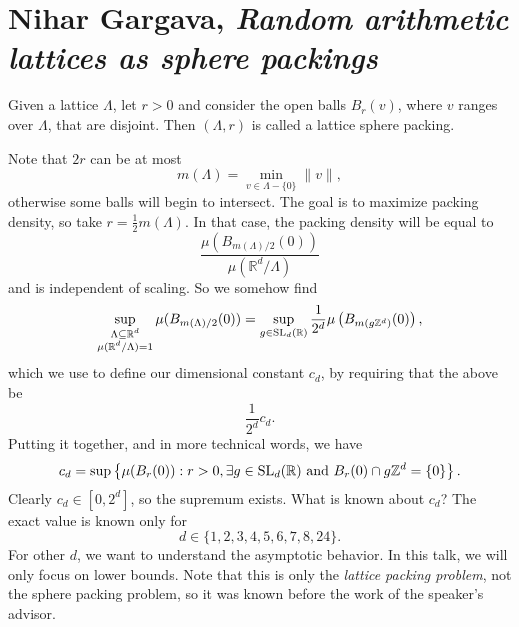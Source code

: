 \documentclass[reqno]{amsart} 
\begin{document}
\section{Nihar Gargava, \emph{Random arithmetic lattices as sphere packings}}
Given a lattice $\Lambda$, let $r > 0$ and consider the open balls $B_r(v)$, where $v$ ranges over $\Lambda$, that are disjoint.  Then $(\Lambda, r)$ is called a lattice sphere packing.

Note that $2 r$ can be at most
\begin{equation*}
  m (\Lambda) = \min_{v \in \Lambda - \{0\}} \lVert v \rVert,
\end{equation*}
otherwise some balls will begin to intersect.  The goal is to maximize packing density, so take $r = \tfrac{1}{2} m (\Lambda) $.  In that case, the packing density will be equal to
\begin{equation*}
  \frac{\mu (B_{m (\Lambda) /2} (0) )}{ \mu (\mathbb{R}^d / \Lambda )}
\end{equation*}
and is independent of scaling.  So we somehow find
\begin{equation*}
  \sup_{
    \substack{
      \Lambda \subseteq \mathbb{R}^d  \\
      \mu (\mathbb{R}^d / \Lambda ) = 1
    }
  }
  \mu (B_{m (\Lambda) / 2} (0) )
  =
  \sup_{g \in \operatorname{SL}_d (\mathbb{R}) }
  \frac{1}{ 2^d } \mu \left( B_{m (g \mathbb{Z}^d )} (0)  \right),
\end{equation*}
which we use to define our dimensional constant $c_d$, by requiring that the above be
\begin{equation*}
  \frac{1}{2^d } c_d .
\end{equation*}
Putting it together, and in more technical words, we have
\begin{equation*}
  c_d = \sup \left\{ \mu (B_r (0) ) : r > 0, \exists g \in \operatorname{SL}_d(\mathbb{R}) \text{ and } B_r(0) \cap g \mathbb{Z}^d = \{0\} \right\}.
\end{equation*}
Clearly $c_d \in [0, 2^d ]$, so the supremum exists.  What is known about $c_d$?  The exact value is known only for
\begin{equation*}
  d \in \{1, 2, 3, 4, 5, 6, 7, 8, 24\}.
\end{equation*}
For other $d$, we want to understand the asymptotic behavior.  In this talk, we will only focus on lower bounds.  Note that this is only the \emph{lattice packing problem}, not the sphere packing problem, so it was known before the work of the speaker's advisor.
\end{document}
